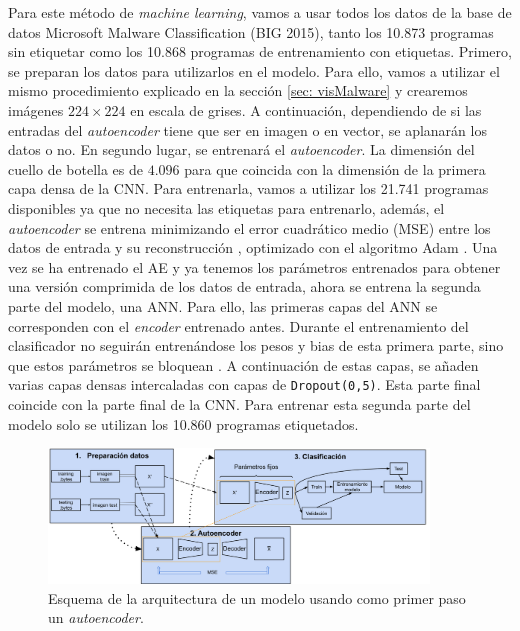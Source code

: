 Para este método de \textit{machine learning}, vamos a usar todos los datos de la base de datos Microsoft Malware Classification (BIG 2015), tanto los 10.873 programas sin etiquetar como los 10.868 programas de entrenamiento con etiquetas. Primero, se preparan los datos para utilizarlos en el modelo. Para ello, vamos a utilizar el mismo procedimiento explicado en la sección \ref{sec: visMalware} y crearemos imágenes $224 \times 224$ en escala de grises. A continuación, dependiendo de si las entradas del \textit{autoencoder} tiene que ser en imagen o en vector, se aplanarán los datos o no. En segundo lugar, se entrenará el \textit{autoencoder}. La dimensión del cuello de botella es de $4.096$ para que coincida con la dimensión de la primera capa densa de la CNN. Para entrenarla, vamos a utilizar los 21.741 programas disponibles ya que no necesita las etiquetas para entrenarlo, además, el \textit{autoencoder} se entrena minimizando el error cuadrático medio (MSE) entre los datos de entrada y su reconstrucción \citep{guo2017deep}, optimizado con el algoritmo Adam \citep{aekeras}. Una vez se ha entrenado el AE y ya tenemos los parámetros entrenados para obtener una versión comprimida de los datos de entrada, ahora se entrena la segunda parte del modelo, una ANN. Para ello, las primeras capas del ANN se corresponden con el \textit{encoder} entrenado antes. Durante el entrenamiento del clasificador no seguirán entrenándose los pesos y bias de esta primera parte, sino que estos parámetros se bloquean \citep{lopes2022effective}. A continuación de estas capas, se añaden varias capas densas intercaladas con capas de \lstinline|Dropout(0,5)|. Esta parte final coincide con la parte final de la CNN. Para entrenar esta segunda parte del modelo solo se utilizan los 10.860 programas etiquetados.

\begin{figure}[h]
    \begin{center}
    \includegraphics[width=0.9\textwidth]{img/aeMMCgen.png}
    \end{center}
    \caption{Esquema de la arquitectura de un modelo usando como primer paso un \textit{autoencoder}.}
    \label{img: aeMMCgen}
\end{figure}

